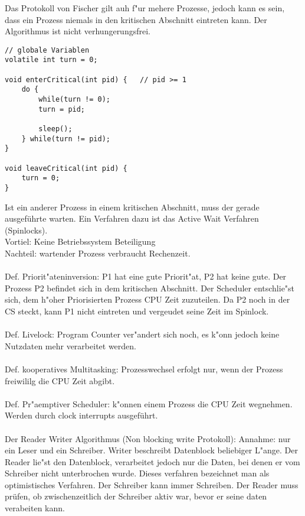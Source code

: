 Das Protokoll von Fischer gilt auh f"ur mehere Prozesse, jedoch kann es sein, dass ein Prozess niemals in den kritischen Abschnitt eintreten kann. Der Algorithmus ist nicht verhungerungsfrei.
\lstset{language=c} 
\begin{lstlisting}[breaklines,showstringspaces=false,frame=none] 
// globale Variablen
volatile int turn = 0;

void enterCritical(int pid) {	// pid >= 1
	do {
		while(turn != 0);
		turn = pid;

		sleep();
	} while(turn != pid);
}

void leaveCritical(int pid) {
	turn = 0;
} 

\end{lstlisting}

Ist ein anderer Prozess in einem kritischen Abschnitt, muss der gerade ausgeführte warten. Ein Verfahren dazu ist das Active Wait Verfahren (Spinlocks). \\
Vortiel: Keine Betriebssystem Beteiligung\\
Nachteil: wartender Prozess verbraucht Rechenzeit.
\\\\
Def. Priorit"ateninversion:
P1 hat eine gute Priorit"at, P2 hat keine gute. Der Prozess P2 befindet sich in dem kritischen Abschnitt. Der Scheduler entschlie"st sich, dem h"oher Priorisierten Prozess CPU Zeit zuzuteilen. Da P2 noch in der CS steckt, kann P1 nicht eintreten und vergeudet seine Zeit im Spinlock. 
\\\\
Def. Livelock:
Program Counter ver"andert sich noch, es k"onn jedoch keine Nutzdaten mehr verarbeitet werden.
\\\\
Def. kooperatives Multitasking:
Prozesswechsel erfolgt nur, wenn der Prozess freiwililg die CPU Zeit abgibt. 
\\\\
Def. Pr"aemptiver Scheduler:
k"onnen einem Prozess die CPU Zeit wegnehmen. Werden durch clock interrupts ausgeführt. 
\\\\
Der Reader Writer Algorithmus (Non blocking write Protokoll):
Annahme: nur ein Leser und ein Schreiber.
Writer beschreibt Datenblock beliebiger L"ange. Der Reader lie"st den Datenblock, verarbeitet jedoch nur die Daten, bei denen er vom Schreiber nicht unterbrochen wurde. Dieses verfahren bezeichnet man als optimistisches Verfahren. Der Schreiber kann immer Schreiben. Der Reader muss prüfen, ob zwischenzeitlich der Schreiber aktiv war, bevor er seine daten verabeiten kann.

